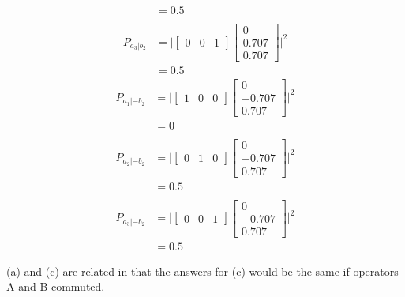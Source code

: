 \documentclass[12pt]{article}
\begin{document}
\begin{align*}
                &= 0.5 \\ \\
    P_{a_3|b_2} &= \biggl|\begin{bmatrix}0&0&1\end{bmatrix}\begin{bmatrix}0\\0.707\\0.707\end{bmatrix}\biggr|^2 \\
                &= 0.5
\end{align*}\begin{align*}
    P_{a_1|-b_2} &= \biggl|\begin{bmatrix}1&0&0\end{bmatrix}\begin{bmatrix}0\\-0.707\\0.707\end{bmatrix}\biggr|^2 \\
                &= 0 \\ \\
    P_{a_2|-b_2} &= \biggl|\begin{bmatrix}0&1&0\end{bmatrix}\begin{bmatrix}0\\-0.707\\0.707\end{bmatrix}\biggr|^2 \\
                &= 0.5 \\ \\
    P_{a_3|-b_2} &= \biggl|\begin{bmatrix}0&0&1\end{bmatrix}\begin{bmatrix}0\\-0.707\\0.707\end{bmatrix}\biggr|^2 \\
                &= 0.5
\end{align*}


\problemasub
(a) and (c) are related in that the answers for (c) would be the same if operators A and B commuted.
\end{document}
